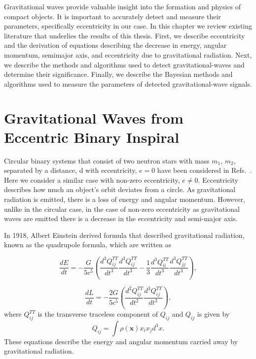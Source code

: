Gravitational waves provide valuable insight into the formation and physics of compact objects. It is important to accurately detect and measure their parameters, specifically eccentricity in our case. In this chapter we review existing literature that underlies the results of this thesis. First, we describe eccentricity and the derivation of equations describing the decrease in energy, angular momentum, semimajor axis, and eccentricity due to gravitational radiation. Next, we describe the methods and algorithms used to detect gravitational-waves and determine their significance. Finally, we describe the Bayesian methods and algorithms used to measure the parameters of detected gravitational-wave signals.

\section{Gravitational Waves from Eccentric Binary Inspiral}\label{GW-eccentricity} 

Circular binary systems that consist of two neutron stars with mass $m_1$, $m_2$, separated by a distance, d with eccentricity, $e = 0$ have been considered in Refs.~\cite{misner:1973,Brown:2004vh}. Here we consider a similar case with non-zero eccentricity, $e \neq 0$. Eccentricity describes how much an object's orbit deviates from a circle. As gravitational radiation is emitted, there is a loss of energy and angular momentum. However, unlike in the circular case, in the case of non-zero eccentricity as gravitational waves are emitted there is a decrease in the eccentricity and semi-major axis.

In 1918, Albert Einstein derived formula that described gravitational radiation, known as the quadrupole formula, which are written as \cite{misner:1973,Peters:1963ux,Peters:1964zz}

\begin{equation}\label{dEdt}
    \frac{dE}{dt} = -\frac{G}{5c^5}\left(\frac{d^3Q^{TT}_{ij}}{dt^3}\frac{d^3Q^{TT}_{ij}}{dt^3} - \frac{1}{3}\frac{d^3Q^{TT}_{ii}}{dt^3}\frac{d^3Q^{TT}_{jj}}{dt^3}\right),
\end{equation}

\begin{equation}\label{dLdt}
    \frac{dL}{dt} = -\frac{2G}{5c^5}\left(\frac{d^2Q^{TT}_{ij}}{dt^2}\frac{d^3Q^{TT}_{ij}}{dt^3}\right),
\end{equation}
where $Q^{TT}_{ij}$ is the transverse traceless component of $Q_{ij}$ and $Q_{ij}$ is given by 
\begin{equation}\label{quad-moment}
    Q_{ij} = \int \rho(\boldsymbol{x})x_ix_jd^3x.
\end{equation}
These equations describe the energy and angular momentum carried away by gravitational radiation.

